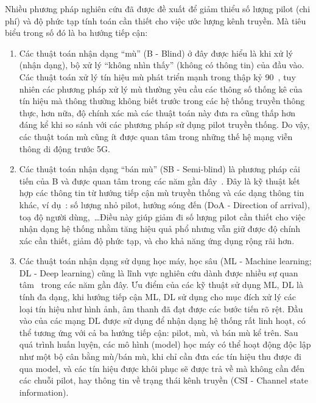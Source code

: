Nhiều phương pháp nghiên cứu đã được đề xuất để giảm thiểu số lượng pilot (chi phí) và độ phức tạp tính toán cần thiết cho việc ước lượng kênh truyền. Mà tiêu biểu trong số đó là ba hướng tiếp cận: 
\begin{enumerate}
    \item Các thuật toán nhận dạng ``mù'' (B - Blind) ở đây được hiểu là khi xử lý (nhận dạng), bộ xử lý ``không nhìn thấy'' (không có thông tin) của đầu vào. Các thuật toán xử lý tín hiệu mù phát triển mạnh trong thập kỷ 90~\cite{abed1997}, tuy nhiên các phương pháp xử lý mù thường yêu cầu các thông số thống kê của tín hiệu mà thông thường không biết trước trong các hệ thống truyền thông thực, hơn nữa, độ chính xác mà các thuật toán này đưa ra cũng thấp hơn đáng kể khi so sánh với các phương pháp sử dụng pilot truyền thống. Do vậy, các thuật toán mù cũng ít được quan tâm trong những thế hệ mạng viễn thông di động trước 5G.

    \item Các thuật toán nhận dạng ``bán mù'' (SB - Semi-blind) là phương pháp cải tiến của B và được quan tâm trong các năm gần đây~\cite{Ladaycia2017, Ladaycia2019, shaik2021}. Đây là kỹ thuật kết hợp các thông tin từ hướng tiếp cận mù truyền thống và các dạng thông tin khác, ví dụ~\cite{Rekik2021}: số lượng nhỏ pilot, hướng sóng đến (DoA - Direction of arrival), toạ độ người dùng,~\ldots Điều này giúp giảm đi số lượng pilot cần thiết cho việc nhận dạng hệ thống nhằm tăng hiệu quả phổ nhưng vẫn giữ được độ chính xác cần thiết, giảm độ phức tạp, và cho khả năng ứng dụng rộng rãi hơn.

    \item Các thuật toán nhận dạng sử dụng học máy, học sâu (ML - Machine learning; DL - Deep learning) cũng là lĩnh vực nghiên cứu dành được nhiều sự quan tâm~\cite{Zhang2019} trong các năm gần đây. Ưu điểm của các kỹ thuật sử dụng ML, DL là tính đa dạng, khi hướng tiếp cận ML, DL sử dụng cho mục đích xử lý các loại tín hiệu như hình ảnh, âm thanh đã đạt được các bước tiến rõ rệt. Đầu vào của các mạng DL được sử dụng để nhận dạng hệ thống rất linh hoạt, có thể tương ứng với cả ba hướng tiếp cận: pilot, mù, và bán mù kể trên. Sau quá trình huấn luyện, các mô hình (model) học máy có thể hoạt động độc lập như một bộ cân bằng mù/bán mù, khi chỉ cần đưa các tín hiệu thu được đi qua model, và các tín hiệu được khôi phục sẽ được trả về mà không cần đến các chuỗi pilot, hay thông tin về trạng thái kênh truyền (CSI - Channel state information).
\end{enumerate}

